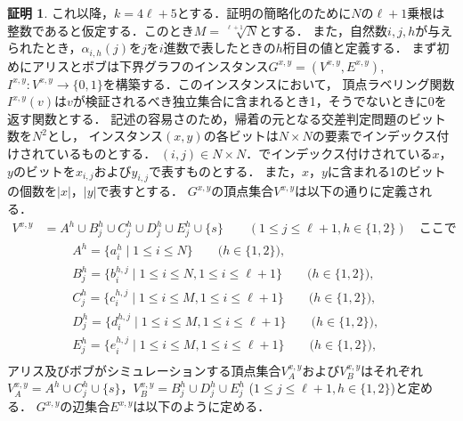 \documentclass[12pt]{thesis}
\theoremstyle{definition}
\newtheorem*{prf*}{証明}
\begin{document}
\begin{prf*}
これ以降，$k = 4\ell +5$とする．証明の簡略化のために$N$の$\ell + 1$乗根は整数であると仮定する．このとき$M = \sqrt[\ell + 1]{N}$とする．
また，自然数$i, j, h$が与えられたとき，$\alpha_{i, h}(j)$を$j$を$i$進数で表したときの$h$桁目の値と定義する．
まず初めにアリスとボブは下界グラフのインスタンス$G^{x,y} = (V^{x,y}, E^{x,y})$, 
$I^{x,y} : V^{x,y} \to \{0, 1\}$を構築する．このインスタンスにおいて，
頂点ラベリング関数$I^{x,y}(v)$は$v$が検証されるべき独立集合に含まれるとき1，そうでないときに0を返す関数とする．
記述の容易さのため，帰着の元となる交差判定問題のビット数を$N^2$とし，
インスタンス$(x, y)$の各ビットは$N\times N$の要素でインデックス付けされているものとする．
$(i, j) \in N \times N$．でインデックス付けされている$x$，$y$のビットを$x_{i,j}$および$y_{i,j}$で表すものとする．
また，$x$，$y$に含まれる1のビットの個数を$|x|$，$|y|$で表すとする．
$G^{x,y}$の頂点集合$V^{x,y}$は以下の通りに定義される．
\begin{align*}
V^{x,y} &= A^{h} \cup B^{h}_{j} \cup C^{h}_{j} \cup D^{h}_{j} \cup E^{h}_{j} \cup \{s\} \quad \quad (1\leq j \leq \ell+1, h \in \{1, 2\}) \quad \text{ここで}\\
&\phantom{=} \quad A^{h} = \{a^{h}_{i} \mid 1\leq i \leq N\} \quad \quad \text{($h \in \{1, 2\}$)}, \\
&\phantom{=} \quad B^{h}_{j} = \{b^{h,j}_{i} \mid 1\leq i \leq N,1\leq i \leq \ell+1\} \quad \quad \text{($h \in \{1, 2\}$)}, \\
&\phantom{=} \quad C^{h}_{j} = \{c^{h,j}_{i} \mid 1\leq i \leq M,1\leq i \leq \ell+1\} \quad \quad \text{($h \in \{1, 2\}$)}, \\
&\phantom{=} \quad D^{h}_{j} = \{d^{h,j}_{i} \mid 1\leq i \leq M,1\leq i \leq \ell+1\} \quad \quad \text{($h \in \{1, 2\}$)}, \\
&\phantom{=} \quad E^{h}_{j} = \{e^{h,j}_{i} \mid 1\leq i \leq M,1\leq i \leq \ell+1\} \quad \quad \text{($h \in \{1, 2\}$)}, \\
\end{align*}
アリス及びボブがシミュレーションする頂点集合$V^{x,y}_{A}$および$V^{x,y}_{B}$はそれぞれ
$V^{x,y}_{A} = A^{h} \cup C^{h}_{j} \cup \{s\}$，$V^{x,y}_{B} = B^{h}_{j} \cup D^{h}_{j} \cup E^{h}_{j}$
($1\leq j \leq \ell+1, h \in \{1, 2\}$)と定める．
$G^{x,y}$の辺集合$E^{x,y}$は以下のように定める．


\end{prf*}
\end{document}
